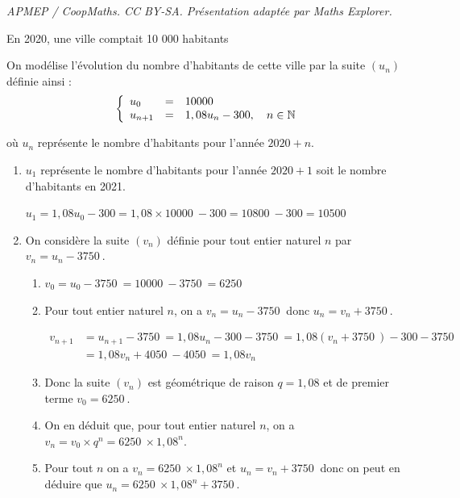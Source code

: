 \documentclass[10pt]{article}
\providecommand{\N}{\mathbb{N}}
\providecommand{\np}[2][]{{#2~#1}}
\begin{document}
\noindent\textit{APMEP / CoopMaths. CC BY-SA. Présentation adaptée par Maths Explorer.}\par\medskip
\medskip

En 2020, une ville comptait 10 000 habitants

On modélise l'évolution du nombre d'habitants de cette ville par la suite $(u_n)$ définie ainsi : 
\[\left\{\begin{array}{l c l}
u_0&=&\np{10000}\\
u_{n+1}&=&1,08u_n - 300,\quad n \in \N 
\end{array}\right.\]

où $u_n$ représente le nombre d'habitants pour l'année $2020 + n$.



\begin{enumerate}
\item
$u_1$  représente le nombre d'habitants pour l'année $2020 + 1$ soit le nombre d'habitants en 2021.

$u_{1}=1,08 u_0 - 300 = 1,08\times \np{10000}-300 = \np{10800}-300=\np{10500}$

\item On considère la suite $(v_n)$ définie pour tout entier naturel $n$ par $v_n = u_n  - \np{3750}$. 
	\begin{enumerate}
		\item 
$v_0=u_0 - 	\np{3750} = \np{10000} - \np{3750} = \np{6250}$
		
		\item 
Pour tout entier naturel $n$, on a $v_n=u_n-\np{3750}$ donc $u_n=v_n+\np{3750}$.

$\begin{aligned}
v_{n+1}
& =u_{n+1}-\np{3750}
 = 1,08u_n -300 -\np{3750}
= 1,08\left ( v_n +\np{3750} \right ) -300 - \np{3750}\\
& =1,08 v_n + \np{4050} - \np{4050}
= 1,08 v_n
\end{aligned}$

		\item
Donc la suite $(v_n)$ est géométrique de raison $q=1,08$ et de premier terme $v_0 = \np{6250}$.

		\item On en déduit que, pour tout entier naturel $n$, on a 
$v_n=v_0\times q^n = \np{6250}\times 1,08^n$.		
		
		\item 
Pour tout $n$ on a $v_n= \np{6250}\times 1,08^n$ et $u_n=v_n+\np{3750}$ donc on peut en déduire que $u_n = \np{6250}\times 1,08^n +\np{3750}$.
	\end{enumerate}
	

\end{enumerate}
\end{document}
